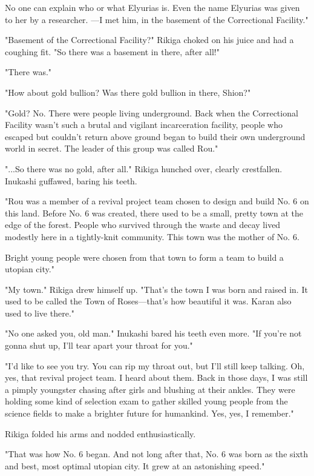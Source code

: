 No one can explain who or what Elyurias is. Even the name Elyurias was
given to her by a researcher. ---I met him, in the basement of the
Correctional Facility."

"Basement of the Correctional Facility?" Rikiga choked on his juice and
had a coughing fit. "So there was a basement in there, after all!"

"There was."

"How about gold bullion? Was there gold bullion in there, Shion?"

"Gold? No. There were people living underground. Back when the
Correctional Facility wasn't such a brutal and vigilant incarceration
facility, people who escaped but couldn't return above ground began to
build their own underground world in secret. The leader of this group
was called Rou."

"...So there was no gold, after all." Rikiga hunched over, clearly
crestfallen. Inukashi guffawed, baring his teeth.

"Rou was a member of a revival project team chosen to design and build
No. 6 on this land. Before No. 6 was created, there used to be a small,
pretty town at the edge of the forest. People who survived through the
waste and decay lived modestly here in a tightly-knit community. This
town was the mother of No. 6.

Bright young people were chosen from that town to form a team to build a
utopian city."

"My town." Rikiga drew himself up. "That's the town I was born and
raised in. It used to be called the Town of Roses---that's how beautiful
it was. Karan also used to live there."

"No one asked you, old man." Inukashi bared his teeth even more. "If
you're not gonna shut up, I'll tear apart your throat for you."

"I'd like to see you try. You can rip my throat out, but I'll still keep
talking. Oh, yes, that revival project team. I heard about them. Back in
those days, I was still a pimply youngster chasing after girls and
blushing at their ankles. They were holding some kind of selection exam
to gather skilled young people from the science fields to make a
brighter future for humankind. Yes, yes, I remember."

Rikiga folded his arms and nodded enthusiastically.

"That was how No. 6 began. And not long after that, No. 6 was born as
the sixth and best, most optimal utopian city. It grew at an astonishing
speed."

